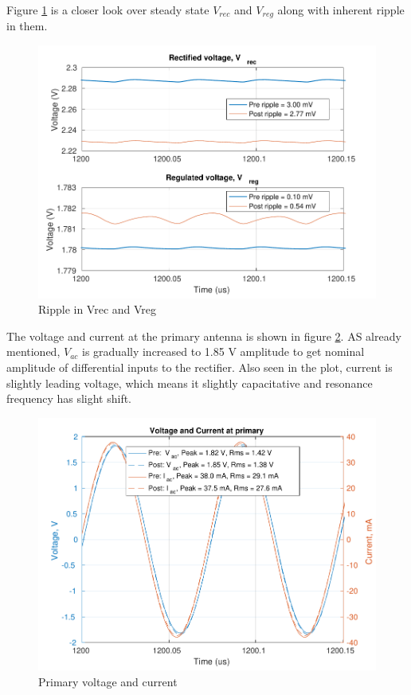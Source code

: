 \documentclass[12pt,a4paper,UKenglish]{report}
\begin{document}
Figure \ref{fig:wpt_ripple} is a closer look over steady state $V_{rec}$ and $V_{reg}$ along with inherent ripple in them. 
\\

\begin{figure} [H]
  \centering
  \includegraphics[width=\textwidth]{img/wpt/wpt_ripple_both.pdf} 
 \caption{Ripple in Vrec and Vreg} 
\label{fig:wpt_ripple} 
\end{figure}

The voltage and current at the primary antenna is shown in figure \ref{fig:wpt_priVI_both}. AS already mentioned, $V_{ac}$ is 
gradually increased to 1.85 V amplitude to get nominal amplitude of differential inputs to the rectifier. Also seen in 
the plot, current is slightly leading voltage, which means it slightly capacitative and resonance frequency has slight shift.

\begin{figure} [H]
  \centering
  \includegraphics[width=\textwidth]{img/wpt/wpt_priVI_both.pdf} 
 \caption{Primary voltage and current} 
\label{fig:wpt_priVI_both} 
\end{figure}
\end{document}
